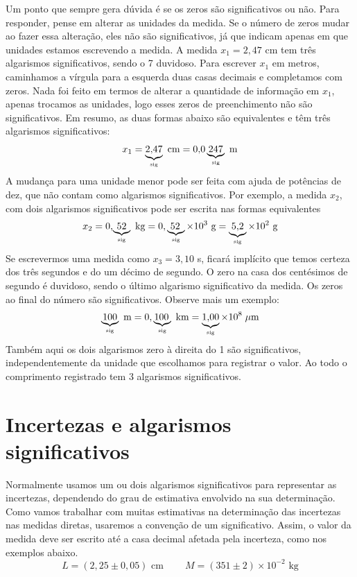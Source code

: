 Um ponto que sempre gera dúvida é se os zeros são significativos ou não. Para responder, pense em alterar as unidades da medida. Se o número de zeros mudar ao fazer essa alteração, eles não são significativos, já que indicam apenas em que unidades estamos escrevendo a medida.  A medida ${x_1}=2,\!47$ cm tem três algarismos significativos, sendo o 7 duvidoso. Para escrever ${x_1}$ em metros, caminhamos a vírgula para a esquerda duas casas decimais e completamos com zeros. Nada foi feito em termos de alterar a quantidade de  informação em ${x_1}$, apenas trocamos as unidades, logo esses zeros de preenchimento não são significativos. Em resumo, as duas formas abaixo são equivalentes e têm três algarismos significativos:
\[
x_1=\underbrace{2,\!47}_{\mbox{\tiny sig}}\mbox{ cm} = 0,\!0\underbrace{247}_{\mbox{\tiny sig}}\mbox{ m}
\]
%
A mudança para uma unidade menor pode ser feita com ajuda de potências de dez, que não contam como algarismos significativos. Por exemplo, a medida ${x_2}$, com dois algarismos significativos pode ser escrita nas formas equivalentes
\[
{x_2}= 0,\!\underbrace{52}_{\mbox{\tiny sig}}\mbox{ kg} = 0,\underbrace{\!52}_{\mbox{\tiny sig}} \times 10^{3}\mbox{ g}  = \underbrace{5,\! 2}_{\mbox{\tiny sig}} \times 10^{2}\mbox{ g}
\]
%
Se escrevermos uma medida como ${x_3}=3,\!10$ s, ficará implícito que temos certeza dos três segundos e do um décimo de segundo. O zero na casa dos centésimos de segundo é duvidoso, sendo o último algarismo significativo da medida. Os zeros ao final do número são significativos. Observe mais um exemplo:
\[
\underbrace{100}_{\mbox{\tiny sig}}\mbox{ m}= 0,\underbrace{\!100}_{\mbox{\tiny sig}}\mbox{ km} = \underbrace{1,\!00}_{\mbox{\tiny sig}}\times 10^{8}\;\mu\mbox{m}
\]
%
Também aqui os dois algarismos zero à direita do 1 são significativos, independentemente da unidade que escolhamos para registrar o valor. Ao todo o comprimento registrado tem 3 algarismos significativos.

\section*{Incertezas e algarismos significativos}
%
%
Normalmente usamos um ou dois algarismos significativos para representar as incertezas, dependendo do grau de estimativa envolvido na sua determina\c c\~ao. Como vamos trabalhar com muitas estimativas na determina\c c\~ao das incertezas nas medidas diretas, usaremos a conven\c c\~ao de um significativo. Assim, o valor da medida deve ser escrito at\'e a casa decimal afetada pela incerteza, como nos exemplos abaixo.
%
\[
L = (2,\!25\pm 0,\!05)\mbox{ cm} \;\;\;\;\;\;\;\;  M = (351 \pm 2)\times 10^{-2}\mbox{ kg}
\]

